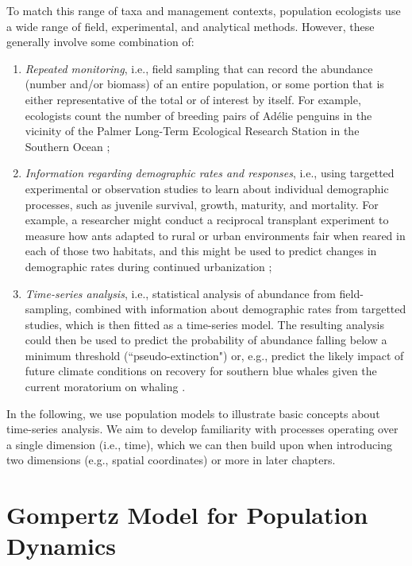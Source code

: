To match this range of taxa and management contexts, population ecologists use a wide range of field, experimental, and analytical methods.  However, these generally involve some combination of:
\begin{enumerate}
    \item \textit{Repeated monitoring}, i.e., field sampling that can record the abundance (number and/or biomass) of an entire population, or some portion that is either representative of the total or of interest by itself.  For example, ecologists count the number of breeding pairs of Adélie penguins in the vicinity of the Palmer Long-Term Ecological Research Station in the Southern Ocean \cite{cimino_long-term_2023};
 
    \item \textit{Information regarding demographic rates and responses}, i.e., using targetted experimental or observation studies to learn about individual demographic processes, such as juvenile survival, growth, maturity, and mortality.  For example, a researcher might conduct a reciprocal transplant experiment to measure how ants adapted to rural or urban environments fair when reared in each of those two habitats, and this might be used to predict changes in demographic rates during continued urbanization \cite{martin_nutshell_2021};
    
    \item \textit{Time-series analysis}, i.e., statistical analysis of abundance from field-sampling, combined with information about demographic rates from targetted studies, which is then fitted as a time-series model.  The resulting analysis could then be used to predict the probability of abundance falling below a minimum threshold (``pseudo-extinction") or, e.g., predict the likely impact of future climate conditions on recovery for southern blue whales given the current moratorium on whaling \cite{tulloch_future_2019}. 
\end{enumerate}
In the following, we use population models to illustrate basic concepts about time-series analysis. We aim to develop familiarity with processes operating over a single dimension (i.e., time), which we can then build upon when introducing two dimensions (e.g., spatial coordinates) or more in later chapters.   

\section{Gompertz Model for Population Dynamics} \label{sec:Chap3_Gompertz_model}

